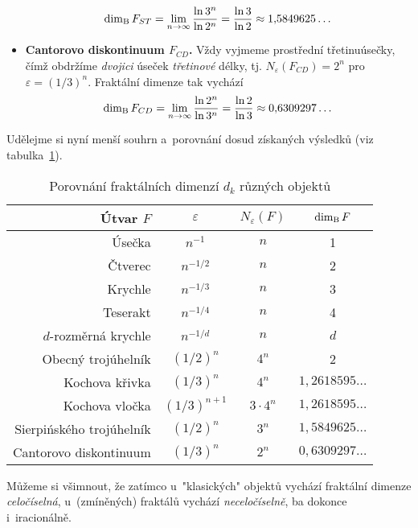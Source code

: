 \begin{itemize}
    \begin{equation}\label{eq:sierpinskeho-trojuhelnik-dimenze}
        \operatorname{dim_B}{F_{ST}}=\lim_{n\to\infty}{\dfrac{\ln{3^n}}{\ln{2^{n}}}}=\dfrac{\ln{3}}{\ln{2}}\approx 1{,}5849625\dots
    \end{equation}
    \item \textbf{Cantorovo diskontinuum $F_{CD}$.} Vždy vyjmeme prostřední třetinu\linebreak{}úsečky, čímž obdržíme \emph{dvojici} úseček \emph{třetinové} délky, tj. $N_\varepsilon(F_{CD})=2^n$ pro $\varepsilon=(1/3)^n$. Fraktální dimenze tak vychází
    \begin{equation}\label{eq:cantorovo-diskontinuum-dimenze}
        \operatorname{dim_B}{F_{CD}}=\lim_{n\to\infty}{\dfrac{\ln{2^n}}{\ln{3^n}}}=\dfrac{\ln{2}}{\ln{3}}\approx 0{,}6309297\dots
    \end{equation}
\end{itemize}
Udělejme si nyní menší souhrn a~porovnání dosud získaných výsledků (viz tabulka~\ref{table:fraktaly-eukleides-dimenze}).
\begin{table}[h]
    \centering
    \begin{tabular}{r|ccc}
        Útvar $F$                & $\varepsilon$ & $N_\varepsilon(F)$ & $\operatorname{dim_B}{F}$         \\ \hline
        Úsečka                   & $n^{-1}$      & $n$                & 1                  \\
        Čtverec                  & $n^{-1/2}$    & $n$                & 2                  \\
        Krychle                  & $n^{-1/3}$    & $n$                & 3                  \\
        Teserakt                 & $n^{-1/4}$    & $n$                & 4                  \\
        $d$-rozměrná krychle     & $n^{-1/d}$    & $n$                & $d$                \\
        Obecný trojúhelník       & $(1/2)^n$     & $4^n$              & 2                  \\
        Kochova křivka           & $(1/3)^n$     & $4^n$              & $1{,}2618595\dots$ \\
        Kochova vločka           & $(1/3)^{n+1}$ & $3\cdot 4^n$       & $1{,}2618595\dots$ \\
        Sierpińského trojúhelník & $(1/2)^n$     & $3^n$              & $1{,}5849625\dots$ \\
        Cantorovo diskontinuum   & $(1/3)^n$     & $2^n$              & $0{,}6309297\dots$ \\
    \end{tabular}
    \caption{Porovnání fraktálních dimenzí $d_k$ různých objektů}
    \label{table:fraktaly-eukleides-dimenze}
\end{table}
Můžeme si všimnout, že zatímco u~"klasických" objektů vychází fraktální dimenze \emph{celočíselná}, u~(zmíněných) fraktálů vychází \emph{neceločíselně}, ba dokonce i~iracionálně.

